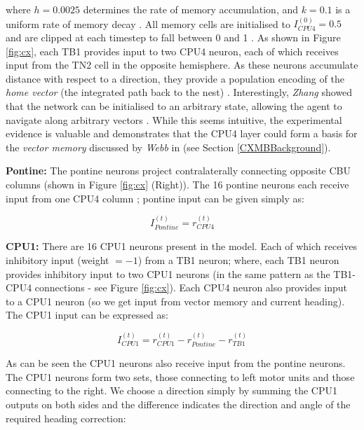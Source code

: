 \documentclass[a4paper,11pt,twoside,openright]{article}
\begin{document}
where $h = 0.0025$ determines the rate of memory accumulation, and $k = 0.1$ is
a uniform rate of memory decay \cite{Stone2017}. All memory cells are initialised
to $I_{CPU4}^{(0)} = 0.5$ and are clipped at each timestep to fall between 0 and
1 \cite{Stone2017}. As shown in Figure \ref{fig:cx}, each TB1 provides input to
two CPU4 neuron, each of which receives input from the TN2 cell in the opposite
hemisphere. As these neurons accumulate distance with respect to a direction,
they provide a population encoding of the \textit{home vector} (the integrated
path back to the nest) \cite{Stone2017}. Interestingly, \textit{Zhang} showed
that the network can be initialised to an arbitrary state, allowing the agent
to navigate along arbitrary vectors \cite{Zhang2017}. While this seems intuitive,
the experimental evidence is valuable and demonstrates that the CPU4 layer could
form a basis for the \textit{vector memory} discussed by \textit{Webb} in
\cite{Webb2018} (see Section \ref{CXMBBackground}).
\newline
\par

\textbf{Pontine:}
The pontine neurons project contralaterally connecting opposite CBU columns
(shown in Figure \ref{fig:cx} (Right)). The 16 pontine neurons each receive input
from one CPU4 column \cite{Stone2017}; pontine input can be given simply as:
\newline
\par

\begin{equation}
  I_{Pontine}^{(t)} = r_{CPU4}^{(t)}
\end{equation}

\textbf{CPU1:}
There are 16 CPU1 neurons present in the model. Each of which
receives inhibitory input (weight $= -1$) from a TB1 neuron; where, each
TB1 neuron provides inhibitory input to two CPU1 neurons (in the same pattern
as the TB1-CPU4 connections - see Figure \ref{fig:cx}). Each CPU4 neuron also
provides input to a CPU1 neuron (so we get input from vector memory and current
heading). The CPU1 input can be expressed as:

\begin{equation}
  I_{CPU1}^{(t)} = r_{CPU1}^{(t)} - r_{Pontine}^{(t)} - r_{TB1}^{(t)}
\end{equation}

As can be seen the CPU1 neurons also receive input from the pontine neurons.
The CPU1 neurons form two sets, those connecting to left motor units and those
connecting to the right. We choose a direction simply by summing the CPU1 outputs
on both sides and the difference indicates the direction and angle of the
required heading correction:
\end{document}
